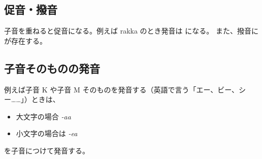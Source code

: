 \subsection{促音・撥音}

子音を重ねると促音になる。例えば rakka のとき発音は  になる。
また、撥音に  が存在する。

\subsection{子音そのものの発音}

例えば子音 K や子音 M そのものを発音する（英語で言う「エー、ビー、シー……」）ときは、
\begin{itemize}
    \item 大文字の場合 \emph{-aa}
    \item 小文字の場合は \emph{-ea}
\end{itemize}
を子音につけて発音する。